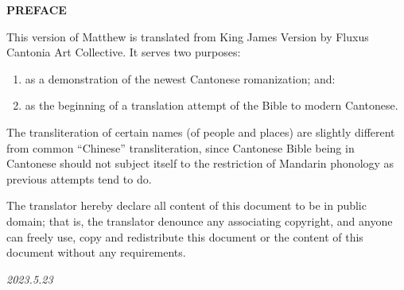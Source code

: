 \documentclass[twoside,twocolumn,a4paper,10pt]{memoir}
\begin{document}
	
	\begin{center} \large \textbf{PREFACE}\normalsize\end{center}
	
	This version of Matthew is translated from King James Version by Fluxus Cantonia Art Collective. It serves two purposes:
	\begin{enumerate}
		\item as a demonstration of 
		the newest Cantonese romanization; and:
		\item as the beginning of a translation attempt of the Bible to modern Cantonese.
	\end{enumerate}
	
	The transliteration of certain names (of people and places) are slightly different from common ``Chinese'' transliteration, since Cantonese Bible being in Cantonese should not subject itself to the restriction of Mandarin phonology as previous attempts tend to do.
	
	The translator hereby declare all content of this document to be in public domain; that is, the translator denounce any associating copyright, and anyone can freely use, copy and redistribute this document or the content of this document without any requirements.
	
	\begin{flushright}
		\textit{2023.5.23}
	\end{flushright}
	
\end{document}
